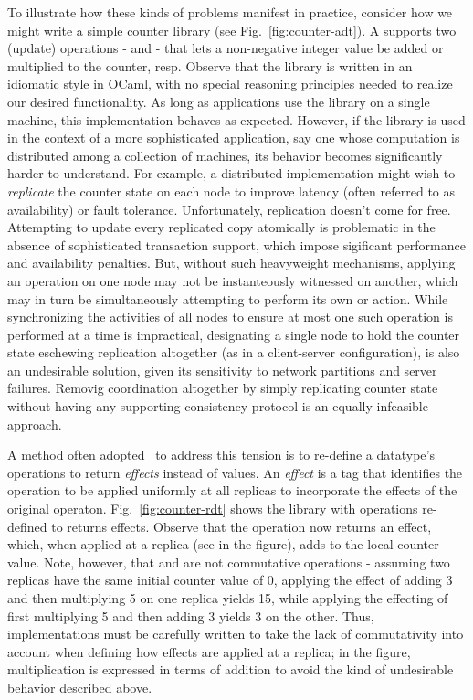 To illustrate how these kinds of problems manifest in practice,
consider how we might write a simple counter library (see
Fig.~\ref{fig:counter-adt}).  A  supports two (update)
operations -  and  - that lets a non-negative integer
value be added or multiplied to the counter, resp.  Observe that the
library is written in an idiomatic style in OCaml, with no special
reasoning principles needed to realize our desired functionality.  As
long as applications use the library on a single machine, this
implementation behaves as expected.  However, if the library is used
in the context of a more sophisticated application, say one whose
computation is distributed among a collection of machines, its
behavior becomes significantly harder to understand.  For example, a
distributed implementation might wish to \emph{replicate} the counter
state on each node to improve latency (often referred to as
availability) or fault tolerance.  Unfortunately, replication doesn't
come for free.  Attempting to update every replicated copy atomically
is problematic in the absence of sophisticated transaction support,
which impose sigificant performance and availability penalties.  But,
without such heavyweight mechanisms, applying an  operation on
one node may not be instanteously witnessed on another, which may in
turn be simultaneously attempting to perform its own  or
 action.  While synchronizing the activities of all nodes to
ensure at most one such operation is performed at a time is
impractical, designating a single node to hold the counter state
eschewing replication altogether (as in a client-server
configuration), is also an undesirable solution, given its sensitivity
to network partitions and server failures.  Removig coordination
altogether by simply replicating counter state without having any
supporting consistency protocol is an equally infeasible approach.

A method often adopted~\cite{crdts, pldi15, gotsman-popl16} to address
this tension is to re-define a datatype's operations to return
\emph{effects} instead of values.  An \emph{effect} is a tag that
identifies the operation to be applied uniformly at all replicas to
incorporate the effects of the original
operaton. Fig.~\ref{fig:counter-rdt} shows the  library
with operations re-defined to returns effects.  Observe that the
 operation now returns an  effect, which,
when applied at a replica (see  in the figure), adds  to
the local counter value.  Note, however, that  and  are
not commutative operations - assuming two replicas have the same
initial counter value of 0, applying the effect of adding 3 and then
multiplying 5 on one replica yields 15, while applying the effecting
of first multiplying 5 and then adding 3 yields 3 on the other.  Thus,
implementations must be carefully written to take the lack of
commutativity into account when defining how effects are applied at a
replica; in the figure, multiplication is expressed in terms of
addition to avoid the kind of undesirable behavior described above.

